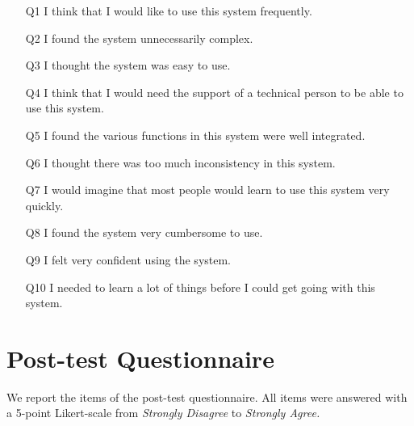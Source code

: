 \begin{itemize}[noitemsep]
\item[Q1] I think that I would like to use this system frequently.	
\item[Q2] I found the system unnecessarily complex.
\item[Q3] I thought the system was easy to use.
\item[Q4] I think that I would need the support of a technical person to be able to use this system.	
\item[Q5] I found the various functions in this system were well integrated.
\item[Q6] I thought there was too much inconsistency in this system.
\item[Q7] I would imagine that most people would learn to use this system very quickly.
\item[Q8] I found the system very cumbersome to use.
\item[Q9] I felt very confident using the system.
\item[Q10] I needed to learn a lot of things before I could get going with this system.
\end{itemize}

\section{Post-test Questionnaire}
\label{app:ps_sp_posttest}
We report the items of the post-test questionnaire.
All items were answered with a 5-point Likert-scale from \emph{Strongly Disagree} to \emph{Strongly Agree.}

